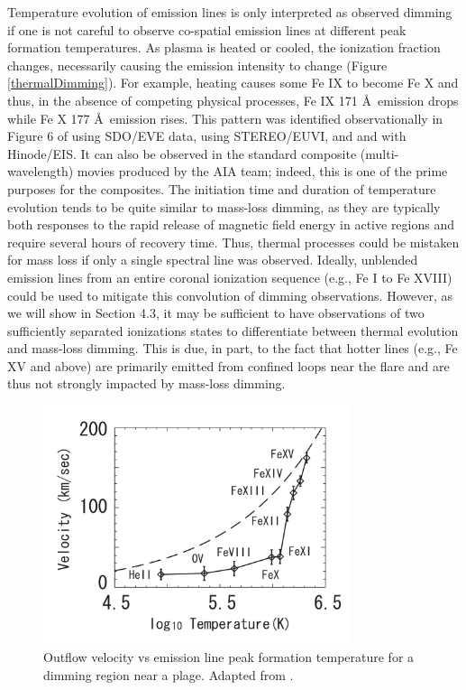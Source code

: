 Temperature evolution of emission lines is only interpreted as observed dimming if one is not careful to observe co-spatial emission lines at different peak formation temperatures. As plasma is heated or cooled, the ionization fraction changes, necessarily causing the emission intensity to change (Figure \ref{thermalDimming}). For example, heating causes some Fe IX to become Fe X and thus, in the absence of competing physical processes, Fe IX 171 \AA\ emission drops while Fe X 177 \AA\ emission rises. This pattern was identified observationally in Figure 6 of \citet{Woods2011} using SDO/EVE data, \citet{Robbrecht2010} using STEREO/EUVI, and \citet{Jin2009} and \citet{Imada2007} with Hinode/EIS. It can also be observed in the standard composite (multi-wavelength) movies produced by the AIA team; indeed, this is one of the prime purposes for the composites. The initiation time and duration of temperature evolution tends to be quite similar to mass-loss dimming, as they are typically both responses to the rapid release of magnetic field energy in active regions and require several hours of recovery time. Thus, thermal processes could be mistaken for mass loss if only a single spectral line was observed. Ideally, unblended emission lines from an entire coronal ionization sequence (e.g., Fe I to Fe XVIII) could be used to mitigate this convolution of dimming observations. However, as we will show in Section 4.3, it may be sufficient to have observations of two sufficiently separated ionizations states to differentiate between thermal evolution and mass-loss dimming. This is due, in part, to the fact that hotter lines (e.g., Fe XV and above) are primarily emitted from confined loops near the flare and are thus not strongly impacted by mass-loss dimming. 

\begin{figure}[!ht]
    \begin{center}
        \includegraphics[width=90mm]{Images/UpflowVsTemperature.png}
    \end{center}
    \caption[Outflow velocity vs temperature]{
        Outflow velocity vs emission line peak formation temperature for a dimming region near a plage. 
        Adapted from \citet{Imada2007}.
    }
    \label{upflowVsTemperature}    
\end{figure}

